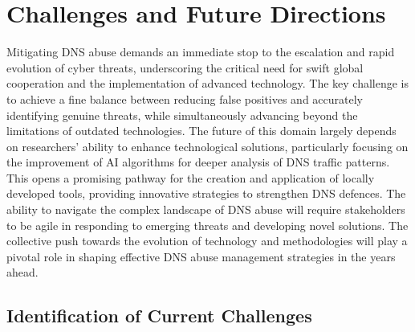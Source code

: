 \section{Challenges and Future Directions}

Mitigating DNS abuse demands an immediate stop to the escalation and rapid evolution of cyber threats, underscoring the critical need for swift global cooperation and the implementation of advanced technology. The key challenge is to achieve a fine balance between reducing false positives and accurately identifying genuine threats, while simultaneously advancing beyond the limitations of outdated technologies. \cite{pour2023comprehensive} The future of this domain largely depends on researchers' ability to enhance technological solutions, particularly focusing on the improvement of AI algorithms for deeper analysis of DNS traffic patterns. This opens a promising pathway for the creation and application of locally developed tools, providing innovative strategies to strengthen DNS defences. The ability to navigate the complex landscape of DNS abuse will require stakeholders to be agile in responding to emerging threats and developing novel solutions. The collective push towards the evolution of technology and methodologies will play a pivotal role in shaping effective DNS abuse management strategies in the years ahead.


\subsection{Identification of Current Challenges}

